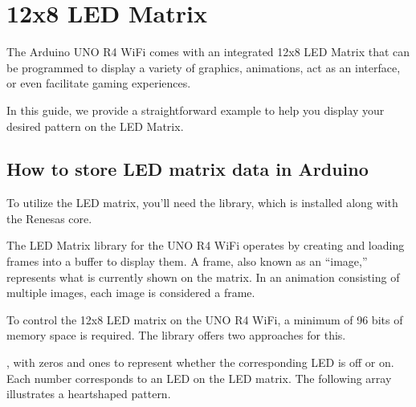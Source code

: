 \documentclass[a4paper,11pt,english]{sphinxmanual}
\begin{document}
\section{12x8 LED Matrix}
\label{\detokenize{Extension_Project/12x8_LED_Matrix:x8-led-matrix}}\label{\detokenize{Extension_Project/12x8_LED_Matrix:ext-12x8-led-matrix}}\label{\detokenize{Extension_Project/12x8_LED_Matrix::doc}}
\sphinxAtStartPar
The Arduino UNO R4 WiFi comes with an integrated 12x8 LED Matrix that can be programmed to display a variety of graphics, animations, act as an interface, or even facilitate gaming experiences.

\noindent{}

\sphinxAtStartPar
In this guide, we provide a straightforward example to help you display your desired pattern on the LED Matrix.


\subsection{How to store LED matrix data in Arduino}
\label{\detokenize{Extension_Project/12x8_LED_Matrix:how-to-store-led-matrix-data-in-arduino}}
\sphinxAtStartPar
To utilize the LED matrix, you’ll need the  library, which is installed along with the Renesas core.

\sphinxAtStartPar
The LED Matrix library for the UNO R4 WiFi operates by creating and loading frames into a buffer to display them. A frame, also known as an “image,” represents what is currently shown on the matrix. In an animation consisting of multiple images, each image is considered a frame.

\sphinxAtStartPar
To control the 12x8 LED matrix on the UNO R4 WiFi, a minimum of 96 bits of memory space is required. The library offers two approaches for this.

\sphinxAtStartPar
{}, with zeros and ones to represent whether the corresponding LED is off or on.  Each number corresponds to an LED on the LED matrix. The following array illustrates a heart\sphinxhyphen{}shaped pattern.
\end{document}
